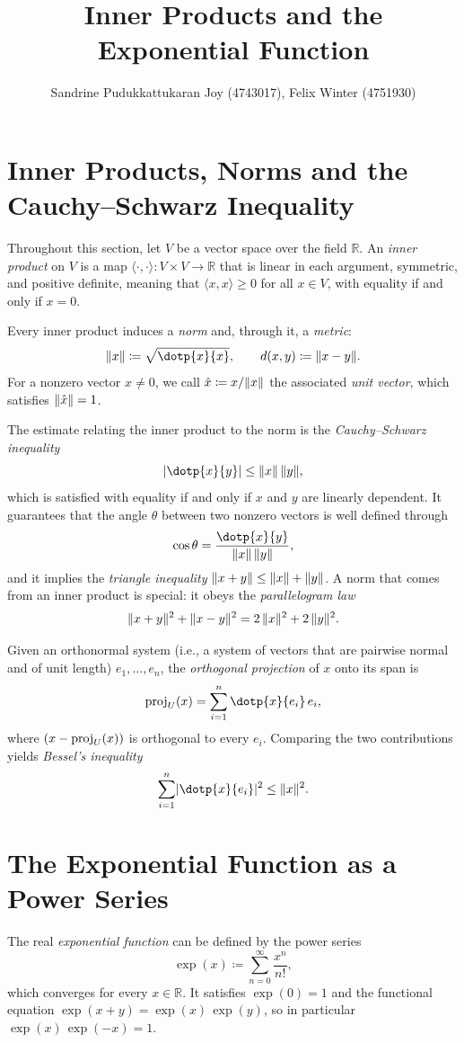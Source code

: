 \documentclass{article}
\title{Inner Products and the Exponential Function}
\author{Sandrine Pudukkattukaran Joy (4743017), Felix Winter (4751930)}
\DeclarePairedDelimiter{\norm}{\lVert}{\rVert}
\DeclarePairedDelimiter{\abs}{\lvert}{\rvert}
\begin{document}
\maketitle

\section{Inner Products, Norms and the Cauchy--Schwarz Inequality}
\label{sec:inner}
Throughout this section, let $V$ be a vector space over the field $\mathbb{R}$.
An \emph{inner product} on $V$ is a map $\langle \cdot, \cdot \rangle \colon V \times V \to \mathbb{R}$ that is linear in each argument, symmetric, and positive definite, meaning that $\langle x, x \rangle \ge 0$ for all $x \in V$, with equality if and only if $x = 0$.

Every inner product induces a \emph{norm} and, through it, a \emph{metric}:
\[
	\norm{x} \coloneqq \sqrt{\dotp{x}{x}}, \qquad d(x, y) \coloneqq \norm{x - y}.
\]
For a nonzero vector $x \neq 0$, we call $\hat{x} \coloneqq x / \norm{x}$ the associated \emph{unit vector}, which satisfies $\norm{\hat{x}} = 1$.

The estimate relating the inner product to the norm is the \emph{Cauchy--Schwarz inequality}
\[
	\abs{\dotp{x}{y}} \le \norm{x} \, \norm{y},
\]
which is satisfied with equality if and only if $x$ and $y$ are linearly dependent.
It guarantees that the angle $\theta$ between two nonzero vectors is well defined through
\[
	\cos\theta = {\dotp{x}{y} \over \norm{x} \, \norm{y}},
\]
and it implies the \emph{triangle inequality} $\norm{x + y} \le \norm{x} + \norm{y}$.
A norm that comes from an inner product is special: it obeys the \emph{parallelogram law}
\[
	\norm{x + y}^2 + \norm{x - y}^2 = 2 \, \norm{x}^2 + 2 \, \norm{y}^2 .
\]

Given an orthonormal system (i.e., a system of vectors that are pairwise normal and of unit length) $e_1, \dots, e_n$, the \emph{orthogonal projection} of $x$ onto its span is
\[
	\textup{proj}_U(x) = \sum_{i=1}^{n} \dotp{x}{e_i} \, e_i ,
\]
where $( x - \textup{proj}_U(x) )$ is orthogonal to every $e_i$.
Comparing the two contributions yields \emph{Bessel's inequality}
\[
	\sum_{i=1}^{n}  \abs{\dotp{x}{e_i}}^2 \le \norm{x}^2 .
\]

\section{The Exponential Function as a Power Series}
\label{sec:exponential}
The real \emph{exponential function} can be defined by the power series
\begin{equation}
\label{eq:exp}
\exp(x) \coloneqq \sum_{n=0}^{\infty} \frac{x^n}{n!},
\end{equation}
which converges for every $x \in \mathbb{R}$. It satisfies $\exp(0) = 1$ and the functional equation $\exp(x + y) = \exp(x)\, \exp(y)$, so in particular $\exp(x)\,\exp(-x) = 1$.
\end{document}
